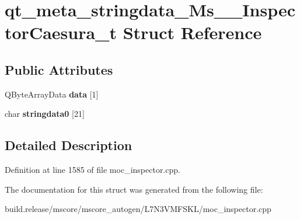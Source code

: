 \hypertarget{structqt__meta__stringdata___ms_____inspector_caesura__t}{}\section{qt\+\_\+meta\+\_\+stringdata\+\_\+\+Ms\+\_\+\+\_\+\+Inspector\+Caesura\+\_\+t Struct Reference}
\label{structqt__meta__stringdata___ms_____inspector_caesura__t}
\subsection*{Public Attributes}
\begin{DoxyCompactItemize}
\item 
\mbox{\label{structqt__meta__stringdata___ms_____inspector_caesura__t_a76f8a855eced44f91ec5dd5a9c7269e2}} 
Q\+Byte\+Array\+Data {\bfseries data} \mbox{[}1\mbox{]}
\item 
\mbox{\label{structqt__meta__stringdata___ms_____inspector_caesura__t_aa413ea2d7505f17384ce7d778f56b4c8}} 
char {\bfseries stringdata0} \mbox{[}21\mbox{]}
\end{DoxyCompactItemize}


\subsection{Detailed Description}


Definition at line 1585 of file moc\+\_\+inspector.\+cpp.



The documentation for this struct was generated from the following file\+:\begin{DoxyCompactItemize}
\item 
build.\+release/mscore/mscore\+\_\+autogen/\+L7\+N3\+V\+M\+F\+S\+K\+L/moc\+\_\+inspector.\+cpp\end{DoxyCompactItemize}

